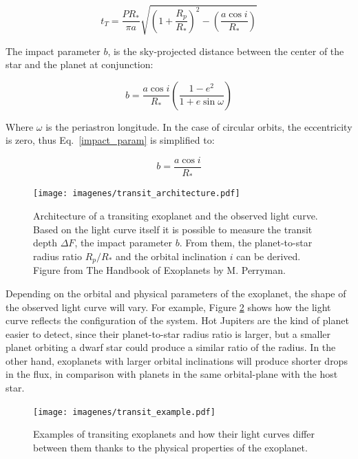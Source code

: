 \begin{equation}
    t_{T} = \frac{PR_{*}}{\pi a} \sqrt{\left(1+\frac{R_{p}}{R_{*}}\right)^2-\left(\frac{a\cos i}{R_{*}}\right)}
\end{equation}

The impact parameter $b$, is the sky-projected distance between the center of the star and the planet at conjunction:

\begin{equation}
    b = \frac{a\cos{i}}{R_{*}}\left(\frac{1-e^2}{1+e\sin{\omega}}\right)
\label{impact_param}
\end{equation}

Where $\omega$ is the periastron longitude. In the case of circular orbits, the eccentricity is zero, thus Eq.~\ref{impact_param} is simplified to:

\begin{equation}
    b = \frac{a\cos{i}}{R_{*}}
\label{impact_param_simple}
\end{equation}

\begin{figure}[H]
\centering
\texttt{[image: imagenes/transit\_architecture.pdf]}
\caption{Architecture of a transiting exoplanet and the observed light curve. Based on the light curve itself it is possible to measure the transit depth $\Delta F$, the impact parameter $b$. From them, the planet-to-star radius ratio $R_{p}/R_{*}$ and the orbital inclination $i$ can be derived. Figure from The Handbook of Exoplanets by M. Perryman.}
\label{transit}
\end{figure}

Depending on the orbital and physical parameters of the exoplanet, the shape of the observed light curve will vary. For example, Figure \ref{transit_examples} shows how the light curve reflects the configuration of the system. Hot Jupiters are the kind of planet easier to detect, since their planet-to-star radius ratio is larger, but a smaller planet orbiting a dwarf star could produce a similar ratio of the radius. In the other hand, exoplanets with larger orbital inclinations will produce shorter drops in the flux, in comparison with planets in the same orbital-plane with the host star.     

\begin{figure}[H]
\centering
\texttt{[image: imagenes/transit\_example.pdf]}
\caption{Examples of transiting exoplanets and how their light curves differ between them thanks to the physical properties of the exoplanet.}
\label{transit_examples}
\end{figure}

